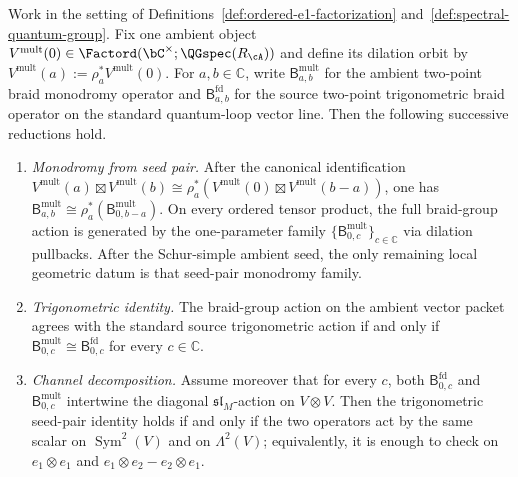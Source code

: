 \begin{theorem}
\label{prop:yangian-dk5-spectral-factorization-seed-mono}%
\label{cor:yangian-dk5-spectral-factorization-seed-mono}%
\label{prop:yangian-dk5-spectral-factorization-seed-trig}%
\label{cor:yangian-dk5-spectral-factorization-seed-trig}%
\label{prop:yangian-dk5-spectral-factorization-seed-channels}%
\label{cor:yangian-dk5-spectral-factorization-seed-single-line}%
\label{prop:yangian-dk5-spectral-factorization-seed-exchange}%
\label{cor:yangian-dk5-spectral-factorization-seed-exchange-mult}%
\label{prop:yangian-dk5-spectral-factorization-seed-alt-mult}%
Work in the setting of
Definitions~\ref{def:ordered-e1-factorization}
and~\ref{def:spectral-quantum-group}.  Fix one ambient object
\(V^{\mathrm{mult}}(0)\in \Factord(\bC^\times;\QGspec(R_{\cA}))\)
and define its dilation orbit by
\(V^{\mathrm{mult}}(a):=\rho_a^*V^{\mathrm{mult}}(0)\).
For \(a,b\in\mathbb C\), write
\(\mathsf B_{a,b}^{\mathrm{mult}}\) for the ambient two-point braid
monodromy operator and \(\mathsf B_{a,b}^{\mathrm{fd}}\) for the
source two-point trigonometric braid operator on the standard
quantum-loop vector line.  Then the following successive reductions
hold.
\begin{enumerate}[label=\textup{(\alph*)}]
\item\emph{Monodromy from seed pair.}
  After the canonical identification
  \(V^{\mathrm{mult}}(a)\boxtimes V^{\mathrm{mult}}(b)
  \cong \rho_a^*(V^{\mathrm{mult}}(0)\boxtimes V^{\mathrm{mult}}(b-a))\),
  one has
  \(\mathsf B_{a,b}^{\mathrm{mult}}
  \cong \rho_a^*(\mathsf B_{0,b-a}^{\mathrm{mult}})\).
  On every ordered tensor product, the full braid-group action is
  generated by the one-parameter family
  \(\{\mathsf B_{0,c}^{\mathrm{mult}}\}_{c\in\mathbb C}\) via
  dilation pullbacks.  After the Schur-simple ambient seed, the only
  remaining local geometric datum is that seed-pair monodromy family.

\item\emph{Trigonometric identity.}
  The braid-group action on the ambient vector packet agrees with the
  standard source trigonometric action if and only if
  \(\mathsf B_{0,c}^{\mathrm{mult}} \cong
  \mathsf B_{0,c}^{\mathrm{fd}}\) for every \(c\in\mathbb C\).

\item\emph{Channel decomposition.}
  Assume moreover that for every \(c\), both
  \(\mathsf B_{0,c}^{\mathrm{fd}}\) and
  \(\mathsf B_{0,c}^{\mathrm{mult}}\) intertwine the diagonal
  \(\mathfrak{sl}_M\)-action on \(V\otimes V\).  Then the
  trigonometric seed-pair identity holds if and only if the two
  operators act by the same scalar on \(\operatorname{Sym}^2(V)\) and
  on \(\Lambda^2(V)\); equivalently, it is enough to check on
  \(e_1\otimes e_1\) and \(e_1\otimes e_2-e_2\otimes e_1\).


\end{enumerate}
\end{theorem}

